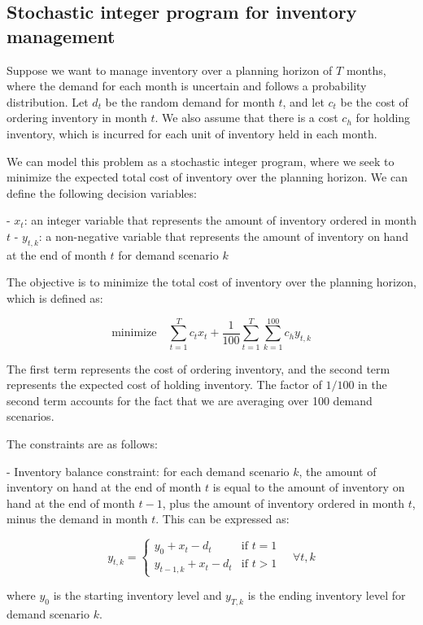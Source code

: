 \subsection*{Stochastic integer program for inventory management}

Suppose we want to manage inventory over a planning horizon of $T$ months, where the demand for each month is uncertain and follows a probability distribution. Let $d_t$ be the random demand for month $t$, and let $c_t$ be the cost of ordering inventory in month $t$. We also assume that there is a cost $c_h$ for holding inventory, which is incurred for each unit of inventory held in each month.

We can model this problem as a stochastic integer program, where we seek to minimize the expected total cost of inventory over the planning horizon. We can define the following decision variables:

- $x_t$: an integer variable that represents the amount of inventory ordered in month $t$
- $y_{t,k}$: a non-negative variable that represents the amount of inventory on hand at the end of month $t$ for demand scenario $k$

The objective is to minimize the total cost of inventory over the planning horizon, which is defined as:

$$\text{minimize} \quad \sum_{t=1}^{T} c_t x_t + \frac{1}{100} \sum_{t=1}^{T} \sum_{k=1}^{100} c_h y_{t,k}$$

The first term represents the cost of ordering inventory, and the second term represents the expected cost of holding inventory. The factor of $1/100$ in the second term accounts for the fact that we are averaging over 100 demand scenarios.

The constraints are as follows:

- Inventory balance constraint: for each demand scenario $k$, the amount of inventory on hand at the end of month $t$ is equal to the amount of inventory on hand at the end of month $t-1$, plus the amount of inventory ordered in month $t$, minus the demand in month $t$. This can be expressed as:

$$y_{t,k} = \begin{cases}
y_0 + x_t - d_t & \text{if } t = 1 \\
y_{t-1,k} + x_t - d_t & \text{if } t > 1
\end{cases} \quad \forall t, k$$

where $y_0$ is the starting inventory level and $y_{T,k}$ is the ending inventory level for demand scenario $k$.

